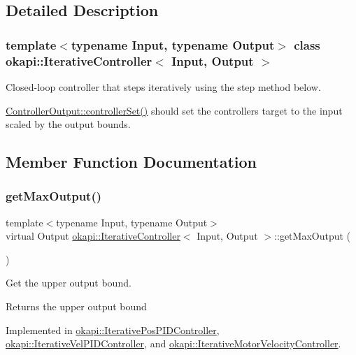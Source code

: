 \subsection{Detailed Description}
\subsubsection*{template$<$typename Input, typename Output$>$\newline
class okapi\+::\+Iterative\+Controller$<$ Input, Output $>$}

Closed-\/loop controller that steps iteratively using the step method below.

\mbox{\hyperlink{classokapi_1_1ControllerOutput_a360c08f0c10b36f882d6d3100c2cad49}{Controller\+Output\+::controller\+Set()}} should set the controller\textquotesingle{}s target to the input scaled by the output bounds. 

\subsection{Member Function Documentation}
\mbox{\label{classokapi_1_1IterativeController_a09bdba3a6d7854d943ed5401210b0595}} 
\subsubsection{\texorpdfstring{getMaxOutput()}{getMaxOutput()}}
{\footnotesize\ttfamily template$<$typename Input, typename Output$>$ \\
virtual Output \mbox{\hyperlink{classokapi_1_1IterativeController}{okapi\+::\+Iterative\+Controller}}$<$ Input, Output $>$\+::get\+Max\+Output (\begin{DoxyParamCaption}{ }\end{DoxyParamCaption})\hspace{0.3cm}{\ttfamily [pure virtual]}}

Get the upper output bound.

\begin{DoxyReturn}{Returns}
the upper output bound 
\end{DoxyReturn}


Implemented in \mbox{\hyperlink{classokapi_1_1IterativePosPIDController_a71538d55cd0a98812a749af84f8ec7aa}{okapi\+::\+Iterative\+Pos\+P\+I\+D\+Controller}}, \mbox{\hyperlink{classokapi_1_1IterativeVelPIDController_acf26277c959a7fd03c918340e194a361}{okapi\+::\+Iterative\+Vel\+P\+I\+D\+Controller}}, and \mbox{\hyperlink{classokapi_1_1IterativeMotorVelocityController_a48d88a7c9cec2c7046d0f7f61d8777c9}{okapi\+::\+Iterative\+Motor\+Velocity\+Controller}}.

